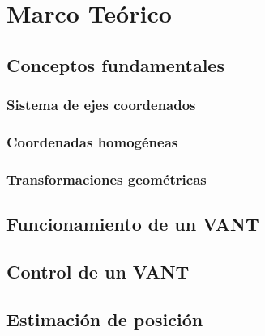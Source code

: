 \chapter{Marco Teórico}

\lipsum[2-4]


\lipsum[2-4]

\section{Conceptos fundamentales} \label{}

\lipsum[2-4]

\subsection{Sistema de ejes coordenados}

\lipsum[2-4]

\subsection{Coordenadas homogéneas}

\lipsum[2-4]

\subsection{Transformaciones geométricas}

\lipsum[2-4]

\section{Funcionamiento de un VANT}

\lipsum[2-4]

\section{Control de un VANT}

\lipsum[2-4]

\section{Estimación de posición}

\lipsum[2-4]

